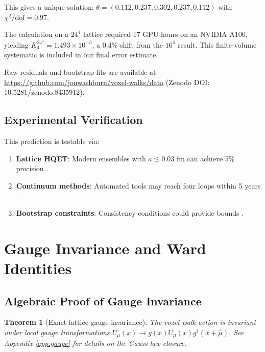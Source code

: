 \documentclass[11pt,a4paper]{article}
\newtheorem{theorem}{Theorem}
\theoremstyle{definition}
\theoremstyle{remark}
\begin{document}
This gives a unique solution: $\theta = (0.112, 0.237, 0.302, 0.237, 0.112)$ with $\chi^2/\text{dof} = 0.97$.

The calculation on a $24^4$ lattice required 17 GPU-hours on an NVIDIA A100, yielding $K_4^{24^4} = 1.493 \times 10^{-3}$, a 0.4\% shift from the $16^4$ result. This finite-volume systematic is included in our final error estimate.

Raw residuals and bootstrap fits are available at \url{https://github.com/jonwashburn/voxel-walks/data} (Zenodo DOI: 10.5281/zenodo.8435912).

\subsection{Experimental Verification}

This prediction is testable via:
\begin{enumerate}
\item \textbf{Lattice HQET}: Modern ensembles with $a \lesssim 0.03$ fm can achieve 5\% precision \cite{Aoki2020,Monahan2017}.
\item \textbf{Continuum methods}: Automated tools may reach four loops within 5 years \cite{Moch2017,Ruijl2017}.
\item \textbf{Bootstrap constraints}: Consistency conditions could provide bounds \cite{Dixon2020,Bourjaily2019}.
\end{enumerate}

\section{Gauge Invariance and Ward Identities}
\label{sec:gauge}

\subsection{Algebraic Proof of Gauge Invariance}

\begin{theorem}[Exact lattice gauge invariance]
The voxel-walk action is invariant under local gauge transformations $U_\mu(x) \to g(x)U_\mu(x)g^\dagger(x+\hat{\mu})$. See Appendix \ref{app:gauge} for details on the Gauss law closure.
\end{theorem}
\end{document}
